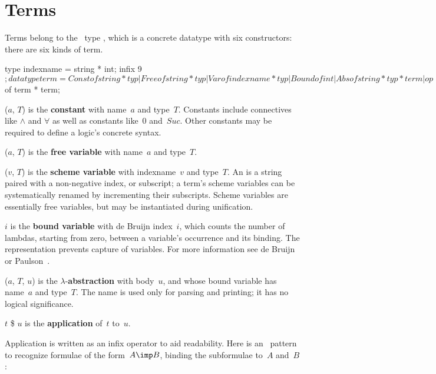 \section{Terms}
Terms belong to the \ML\ type , which is a concrete datatype
with six constructors: there are six kinds of term.
\begin{ttbox}
type indexname = string * int;
infix 9 $;
datatype term = Const of string * typ
              | Free  of string * typ
              | Var   of indexname * typ
              | Bound of int
              | Abs   of string * typ * term
              | op $  of term * term;
\end{ttbox}
\begin{ttdescription}
\item[\ttindexbold{Const}($a$, $T$)] 
  is the {\bf constant} with name~$a$ and type~$T$.  Constants include
  connectives like $\land$ and $\forall$ as well as constants like~0
  and~$Suc$.  Other constants may be required to define a logic's concrete
  syntax. 

\item[\ttindexbold{Free}($a$, $T$)] 
  is the {\bf free variable} with name~$a$ and type~$T$.

\item[\ttindexbold{Var}($v$, $T$)] 
  is the {\bf scheme variable} with indexname~$v$ and type~$T$.  An
   is a string paired with a non-negative index, or
  subscript; a term's scheme variables can be systematically renamed by
  incrementing their subscripts.  Scheme variables are essentially free
  variables, but may be instantiated during unification.

\item[\ttindexbold{Bound} $i$] 
  is the {\bf bound variable} with de Bruijn index~$i$, which counts the
  number of lambdas, starting from zero, between a variable's occurrence
  and its binding.  The representation prevents capture of variables.  For
  more information see de Bruijn \cite{debruijn72} or
  Paulson~\cite[page~336]{paulson91}.

\item[\ttindexbold{Abs}($a$, $T$, $u$)]
  is the $\lambda$-{\bf abstraction} with body~$u$, and whose bound
  variable has name~$a$ and type~$T$.  The name is used only for parsing
  and printing; it has no logical significance.

\item[$t$ \$ $u$]  
is the {\bf application} of~$t$ to~$u$.  
\end{ttdescription}
Application is written as an infix operator to aid readability.
Here is an \ML\ pattern to recognize \FOL{} formulae of
the form~$A\imp B$, binding the subformulae to~$A$ and~$B$:


